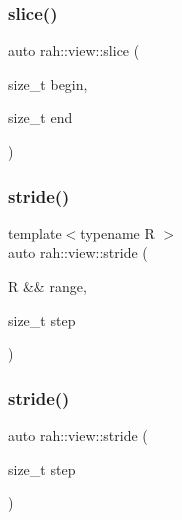 \mbox{\label{namespacerah_1_1view_a5de38bdaa214caef589b2adcdc59dd0b}} 
\subsubsection{\texorpdfstring{slice()}{slice()}\hspace{0.1cm}{\footnotesize\ttfamily [2/2]}}
{\footnotesize\ttfamily auto rah\+::view\+::slice (\begin{DoxyParamCaption}\item[{size\+\_\+t}]{begin,  }\item[{size\+\_\+t}]{end }\end{DoxyParamCaption})}

\mbox{\label{namespacerah_1_1view_a112a1a8d31435c1070c4cd98cc02d96a}} 
\subsubsection{\texorpdfstring{stride()}{stride()}\hspace{0.1cm}{\footnotesize\ttfamily [1/2]}}
{\footnotesize\ttfamily template$<$typename R $>$ \\
auto rah\+::view\+::stride (\begin{DoxyParamCaption}\item[{R \&\&}]{range,  }\item[{size\+\_\+t}]{step }\end{DoxyParamCaption})}

\mbox{\label{namespacerah_1_1view_a6b2ab3621be4004c35d77f06165fce78}} 
\subsubsection{\texorpdfstring{stride()}{stride()}\hspace{0.1cm}{\footnotesize\ttfamily [2/2]}}
{\footnotesize\ttfamily auto rah\+::view\+::stride (\begin{DoxyParamCaption}\item[{size\+\_\+t}]{step }\end{DoxyParamCaption})}


